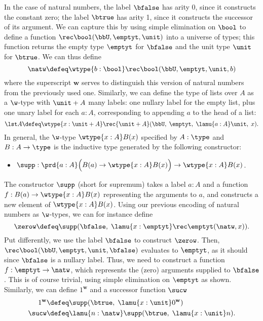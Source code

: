 In the case of natural numbers, the label $\bfalse$ has arity 0, since it constructs the constant zero; the label $\btrue$ has arity 1, since it constructs the successor of its argument. We can capture this by using simple elimination on $\bool$ to define a function $\rec\bool(\bbU,\emptyt,\unit)$ into a universe of types; this function returns the empty type $\emptyt$ for $\bfalse$ and the unit type $\unit$ for $\btrue$. We can thus define
%
%
\[ \natw \defeq \wtype{b:\bool} \rec\bool(\bbU,\emptyt,\unit,b) \]
where the superscript $\mathbf{w}$ serves to distinguish this version of natural numbers from the previously used one.
Similarly, we can define the type of lists over $A$ as a $\w$-type with $\unit + A$ many labels: one nullary label for the empty list, plus one unary label for each $a : A$, corresponding to appending $a$ to the head of a list:
\[ \lst A \defeq \wtype{x: \unit + A} \rec{\unit + A}(\bbU, \; \emptyt, \; \lamu{a:A} \unit,\; x). \]
%
%
%
In general, the $\w$-type $\wtype{x:A} B(x)$ specified by  $A : \type$ and $B : A \to \type$ is the inductive type generated by the following constructor:
\begin{itemize}
\item \label{defn:supp}
  $\supp : \prd{a:A} \Big(B(a) \to \wtype{x:A} B(x)\Big) \to \wtype{x:A} B(x)$.
\end{itemize}
%
The constructor $\supp$ (short for supremum) takes a label $a : A$ and a function $f : B(a) \to \wtype{x:A} B(x)$ representing the arguments to $a$, and constructs a new element of $\wtype{x:A} B(x)$. Using our previous encoding of natural numbers as $\w$-types, we can for instance define
\begin{equation*}
\zerow \defeq \supp(\bfalse, \; \lamu{x:\emptyt} \rec\emptyt(\natw,x)).
\end{equation*}
Put differently, we use the label $\bfalse$ to construct $\zerow$. Then, $\rec\bool(\bbU,\emptyt,\unit, \bfalse)$ evaluates to $\emptyt$, as it should since $\bfalse$ is a nullary label. Thus, we need to construct a function $f : \emptyt \to \natw$, which represents the (zero) arguments supplied to $\bfalse$. This is of course trivial, using simple elimination on $\emptyt$ as shown. Similarly, we can define $1^{\mathbf{w}}$ and a successor function $\sucw$
\begin{align*}
1^{\mathbf{w}} &\defeq \supp(\btrue, \; \lamu{x:\unit} 0^{\mathbf{w}}) \\
\sucw&\defeq \lamu{n:\natw} \supp(\btrue, \; \lamu{x:\unit} n).
\end{align*}


